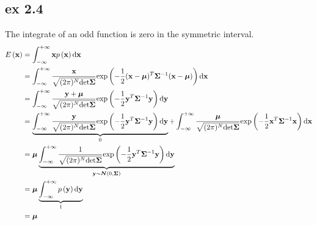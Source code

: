 \documentclass[10pt]{article}
\begin{document}
\subsection{ex 2.4}
The integrate of an odd function is zero in the symmetric interval.
\begin{equation}
	\begin{split}
		E\left(\mathbf{x} \right) &= \int_{-\infty}^{+\infty}\mathbf{x}p\left(\mathbf{x}\right)\mathrm{d}\mathbf{x} \hfill \\
		&= \int_{-\infty}^{+\infty}\frac{\mathbf{x}}{\sqrt{(2\pi)^N\text{det}\boldsymbol{\Sigma}}}\text{exp}\left(-\frac{1}{2}(\mathbf{x}-\boldsymbol{\mu})^T\boldsymbol{\Sigma}^{-1}(\mathbf{x}-\boldsymbol{\mu})\right)\mathrm{d}\mathbf{x} \hfill \\  
		&=  
		\int_{-\infty}^{+\infty}\frac{\mathbf{y}+\boldsymbol{\mu}}{\sqrt{(2\pi)^N\text{det}\boldsymbol{\Sigma}}}\text{exp}\left(-\frac{1}{2}\mathbf{y}^T\boldsymbol{\Sigma}^{-1}\mathbf{y}\right)\mathrm{d}\mathbf{y} \hfill \\
		&=
		\underbrace{\int_{-\infty}^{+\infty}\frac{\mathbf{y}}{\sqrt{(2\pi)^N\text{det}\boldsymbol{\Sigma}}}\text{exp}\left(-\frac{1}{2}\mathbf{y}^T\boldsymbol{\Sigma}^{-1}\mathbf{y}\right)\mathrm{d}\mathbf{y}}_{0} +\hfill  \int_{-\infty}^{+\infty}\frac{\boldsymbol{\mu}}{\sqrt{(2\pi)^N\text{det}\boldsymbol{\Sigma}}}\text{exp}\left(-\frac{1}{2}\mathbf{x}^T\boldsymbol{\Sigma}^{-1}\mathbf{x}\right)\mathrm{d}\mathbf{x} \hfill
		\\&=
		\boldsymbol{\mu}\underbrace{\int_{-\infty}^{+\infty}\frac{1}{\sqrt{(2\pi)^N\text{det}\boldsymbol{\Sigma}}}\text{exp}\left(-\frac{1}{2}\mathbf{y}^T\boldsymbol{\Sigma}^{-1}\mathbf{y}\right)\mathrm{d}\mathbf{y}}_{\mathbf{y}\sim\boldsymbol{N}(0,\boldsymbol{\Sigma})} \hfill
		\\&=
		\boldsymbol{\mu}\underbrace{\int_{-\infty}^{+\infty}p\left(\mathbf{y}\right)\mathrm{d}\mathbf{y}}_{1} \hfill
		\\&=   \boldsymbol{\mu}
	\end{split}
\end{equation}
\end{document}

